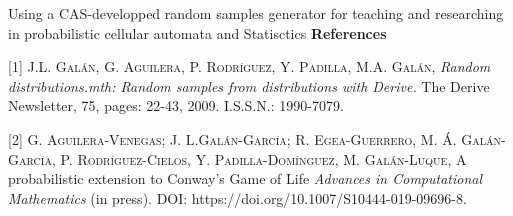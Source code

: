 \begin{abstract_online}{Using a CAS-developped random samples generator for teaching and researching in probabilistic cellular automata and Statisctics}
\textbf{References} \newline{}

   
[1] \textsc{J.L. Gal\'an, G. Aguilera, P. Rodr\'\i guez, Y. Padilla, M.A. Gal\'an}, \emph{Random distributions.mth: Random samples from distributions with Derive.}          
The Derive Newsletter, 75, pages: 22-43, 2009. I.S.S.N.: 1990-7079.

[2] \textsc{G. Aguilera-Venegas; J. L.Gal\'an-Garc\'\i a; R. Egea-Guerrero, M. \'A. Gal\'an-Garc\'\i a, P. Rodr\'\i guez-Cielos, Y. Padilla-Dom\'\i nguez, M. Gal\'an-Luque}, A probabilistic extension to Conway's Game of Life \emph{Advances in Computational Mathematics} (in press). DOI: https://doi.org/10.1007/S10444-019-09696-8.




\end{abstract_online}
    